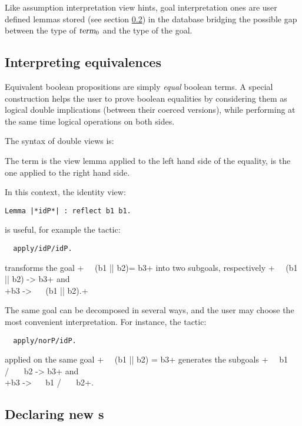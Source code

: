 Like assumption interpretation view hints, goal interpretation ones
are user defined lemmas stored (see section \ref{ssec:vhints}) in the
 database bridging
the possible gap between the type of $\ssrN[0]{term}$ and the type of the
goal.


\subsection{Interpreting equivalences}

Equivalent boolean propositions are simply \emph{equal} boolean terms.
A special construction helps the user to prove boolean equalities by
considering them as logical double implications (between their coerced
versions), while
performing at the same time logical operations on both sides.

The syntax of double views is:
\begin{center}
   \ssrC{/} 
\end{center}

The term  is the view lemma applied to the left hand side of the
equality,  is the one applied to the right hand side.

In this context, the identity view:
\begin{lstlisting}
Lemma |*idP*| : reflect b1 b1.
\end{lstlisting}
is useful, for example the tactic:
\begin{lstlisting}
  apply/idP/idP.
\end{lstlisting}
transforms the goal
\ssrL+~~ (b1 || b2)= b3+
 into two subgoals, respectively
 \ssrL+~~  (b1 || b2) -> b3+ and \\
\ssrL+b3 -> ~~  (b1 || b2).+

The same goal can be decomposed in several ways, and the user may
choose the most convenient interpretation. For instance, the tactic:
\begin{lstlisting}
  apply/norP/idP.
\end{lstlisting}
applied on the same goal \ssrL+~~ (b1 || b2) = b3+ generates the subgoals
\ssrL+~~  b1 /\ ~~  b2 -> b3+ and\\
\ssrL+b3 -> ~~  b1 /\ ~~  b2+.


\subsection{Declaring new s}\label{ssec:vhints}

